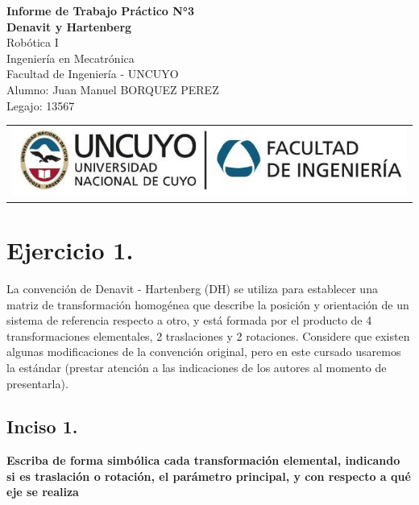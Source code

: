 \documentclass[a4paper,12pt]{article}
\begin{document}
\begin{titlepage}
    \centering
    \vspace*{5cm}
    {\Huge\bfseries Informe de Trabajo Práctico N°3}\\
    \vspace{0.2cm}
    {\Large \textbf{Denavit y Hartenberg}}\\
    \vspace{0.5cm}
    {\Large Robótica I}\\
    \vspace{0.5 cm}
    {\Large Ingeniería en Mecatrónica}\\
    \vspace{0.2 cm}
    {\Large Facultad de Ingeniería - UNCUYO}\\
    \vspace{1.5cm}
    Alumno: Juan Manuel BORQUEZ PEREZ\\
    Legajo: 13567\\
    \vfill
    {\begin{tabular}{@{}c@{}}\includegraphics[scale=0.4]{escudo.PNG}\end{tabular}}\hspace{10pt}
\end{titlepage}

\section{Ejercicio 1.}
La convención de Denavit - Hartenberg (DH) se utiliza para establecer una matriz
de transformación homogénea que describe la posición y orientación de un sistema de
referencia respecto a otro, y está formada por el producto de 4 transformaciones elementales,
2 traslaciones y 2 rotaciones. Considere que existen algunas modificaciones de la convención
original, pero en este cursado usaremos la estándar (prestar atención a las indicaciones de los
autores al momento de presentarla).

\subsection{Inciso 1.}
\textbf{Escriba de forma simbólica cada transformación elemental, indicando si es
traslación o rotación, el parámetro principal, y con respecto a qué eje se realiza}
\end{document}
